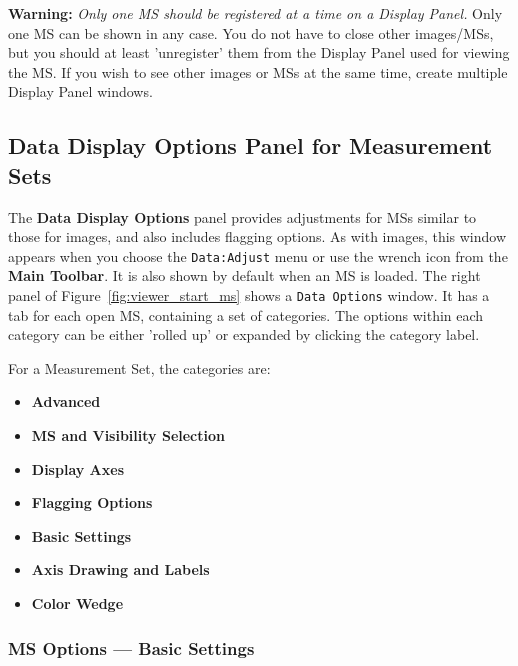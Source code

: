 {\bf Warning:} {\em Only one MS should be registered at a time on a
Display Panel.} 
Only one MS can be shown in any case.  
You do not have to close other images/MSs, but you should at
least 'unregister' them from the Display Panel used for viewing the MS.
If you wish to see other images or MSs at the same time, create multiple
Display Panel windows.

 


\subsection{Data Display Options Panel for Measurement Sets}
\label{section:display.ms.adjust}

The {\bf Data Display Options} panel provides adjustments for MSs
similar to those for images, and also includes flagging options.
As with images, this window appears when you choose the {\tt Data:Adjust}
menu or use the wrench icon from the {\bf Main Toolbar}. It is also shown
by default when an MS is loaded. The right panel
of Figure~\ref{fig:viewer_start_ms} shows a {\tt Data Options} window. 
It has a tab for each open MS, containing a set of categories.  The
options within each category can be either 'rolled up' or expanded by
clicking the category label.

For a Measurement Set, the categories are:
\begin{itemize}
   \item {\bf Advanced}
   \item {\bf MS and Visibility Selection}
   \item {\bf Display Axes}
   \item {\bf Flagging Options}
   \item {\bf Basic Settings}
   \item {\bf Axis Drawing and Labels}
   \item {\bf Color Wedge}
\end{itemize}


\subsubsection{MS Options --- Basic Settings}
\label{section:display.ms.adjust.basic}


